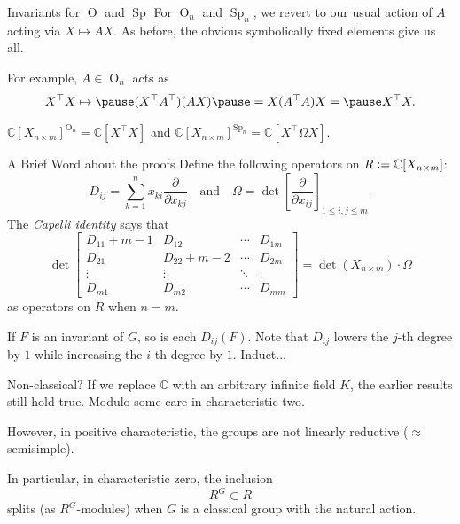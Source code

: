 \documentclass{beamer}
\DeclareMathOperator{\Sp}{Sp}
\DeclareMathOperator{\OO}{O}
\begin{document}
	\begin{frame}{Invariants for \texorpdfstring{$\OO$}{O} and \texorpdfstring{$\Sp$}{Sp}}
		For $\OO_{n}$ and $\Sp_{n}$, we revert to our usual action of $A$ acting via $X \mapsto AX$. \pause As before, the obvious symbolically fixed elements give us all. \pause

		For example, $A \in \OO_{n}$ acts as
		\begin{equation*} 
			X^{\top} X \mapsto \pause (X^{\top} A^{\top}) (A X) \pause = X (A^{\top} A) X = \pause X^{\top} X.
		\end{equation*}
		\pause 

		\begin{theorem}
			$\mathbb{C}[X_{n \times m}]^{\OO_{n}} = \mathbb{C}[X^{\top} X]$ and $\mathbb{C}[X_{n \times m}]^{\Sp_{n}} = \mathbb{C}[X^{\top} \Omega X]$.
		\end{theorem}
	\end{frame}

	\begin{frame}{A Brief Word about the proofs}
		Define the following operators on $R \vcentcolon= \mathbb{C}[X_{n \times m}]$:
		\begin{equation*} 
			D_{ij} = \sum_{k = 1}^{n} x_{ki} \dfrac{\partial}{\partial x_{kj}} \quad\text{and}\quad \Omega = \det \left[\dfrac{\partial}{\partial x_{ij}}\right]_{1 \le i, j \le m}.
		\end{equation*}
		\pause 
		The \emph{Capelli identity} says that
		\begin{equation*} 
			\det 
			\begin{bmatrix}
				D_{11} + m - 1 & D_{12} & \cdots & D_{1m} \\
				D_{21} & D_{22} + m - 2 & \cdots & D_{2m} \\
				\vdots & \vdots & \ddots & \vdots \\
				D_{m1} & D_{m2} & \cdots & D_{mm}
			\end{bmatrix}
			= \det(X_{n \times m}) \cdot \Omega
		\end{equation*}
		as operators on $R$ when $n = m$. \pause

		If $F$ is an invariant of $G$, so is each $D_{ij}(F)$. Note that $D_{ij}$ lowers the $j$-th degree by $1$ while increasing the $i$-th degree by $1$. Induct...
	\end{frame}

	\begin{frame}{Non-classical?}
		If we replace $\mathbb{C}$ with an arbitrary infinite field $K$, the earlier results still hold true. \pause \hfill {\tiny Modulo some care in characteristic two.}

		\pause However, in positive characteristic, the groups are not linearly reductive \pause ($\approx$ semisimple). 

		\pause In particular, in characteristic zero, the inclusion
		\begin{equation*} 
			R^{G} \subset R
		\end{equation*}
		splits (as $R^{G}$-modules) when $G$ is a classical group with the natural action. 
	\end{frame}
\end{document}
